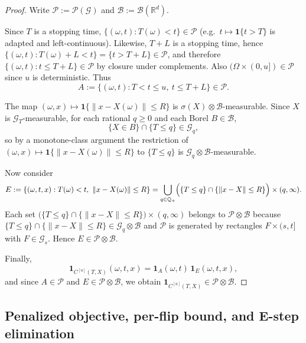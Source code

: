 \documentclass{statsoc}
\newcommand{\1}{\mathbbm{1}}
\begin{document}
\begin{proof}
Write $\mathcal P:=\mathcal P(\mathcal G)$ and $\mathcal B:=\mathcal B(\mathbb R^d)$.

Since $T$ is a stopping time, $\{(\omega,t):T(\omega)<t\}\in\mathcal P$ (e.g.\ $t\mapsto \mathbf 1\{t>T\}$ is adapted and
left-continuous).
Likewise, $T+L$ is a stopping time, hence $\{(\omega,t):T(\omega)+L<t\}=\{t>T+L\}\in\mathcal P$, and therefore
$\{(\omega,t):t\le T+L\}\in\mathcal P$ by closure under complements.
Also $(\Omega\times(0,u])\in\mathcal P$ since $u$ is deterministic.
Thus
\[
A:=\{(\omega,t): T<t\le u,\ t\le T+L\}\in\mathcal P.
\]

The map $(\omega,x)\mapsto \mathbf 1\{\|x-X(\omega)\|\le R\}$ is $\sigma(X)\otimes\mathcal B$-measurable.
Since $X$ is $\mathcal G_T$-measurable, for each rational $q\ge 0$ and each Borel $B\in\mathcal B$,
\[
\{X\in B\}\cap\{T\le q\}\in\mathcal G_q,
\]
so by a monotone-class argument the restriction of $(\omega,x)\mapsto \mathbf 1\{\|x-X(\omega)\|\le R\}$ to $\{T\le q\}$
is $\mathcal G_q\otimes\mathcal B$-measurable.

Now consider
\[
E:=\{(\omega,t,x): T(\omega)<t,\ \|x-X(\omega)\|\le R\}
=
\bigcup_{q\in\mathbb Q_+}\Bigl(\{T\le q\}\cap\{\|x-X\|\le R\}\Bigr)\times(q,\infty).
\]
Each set $\bigl(\{T\le q\}\cap\{\|x-X\|\le R\}\bigr)\times(q,\infty)$ belongs to $\mathcal P\otimes\mathcal B$
because $\{T\le q\}\cap\{\|x-X\|\le R\}\in\mathcal G_q\otimes\mathcal B$ and $\mathcal P$ is generated by rectangles
$F\times(s,t]$ with $F\in\mathcal G_s$.
Hence $E\in\mathcal P\otimes\mathcal B$.

Finally,
\[
\mathbf 1_{C^{[u]}(T,X)}(\omega,t,x)=\mathbf 1_A(\omega,t)\,\mathbf 1_E(\omega,t,x),
\]
and since $A\in\mathcal P$ and $E\in\mathcal P\otimes\mathcal B$, we obtain
$\mathbf 1_{C^{[u]}(T,X)}\in\mathcal P\otimes\mathcal B$.
\end{proof}

\subsection{Penalized objective, per-flip bound, and E-step elimination}\label{sec:perflip}
\end{document}
